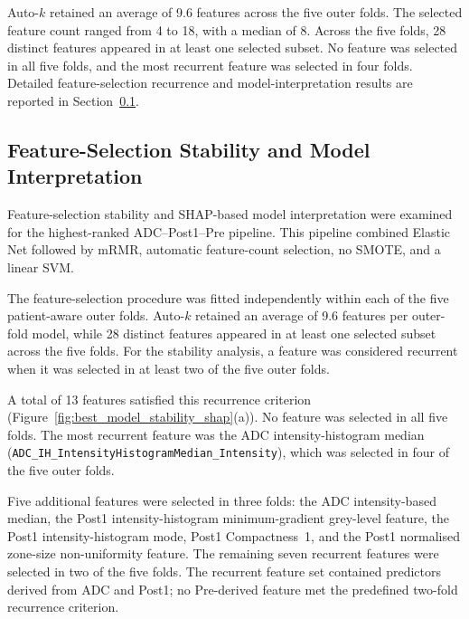 \documentclass[12pt,twocolumn]{article}
\begin{document}
Auto-\(k\) retained an average of 9.6 features across the five outer
folds. The selected feature count ranged from 4 to 18, with a median
of 8. Across the five folds, 28 distinct features appeared in at
least one selected subset. No feature was selected in all five folds,
and the most recurrent feature was selected in four folds. Detailed
feature-selection recurrence and model-interpretation results are
reported in Section~\ref{subsec:interpretability_results}.












\subsection{Feature-Selection Stability and Model Interpretation}
\label{subsec:interpretability_results}

Feature-selection stability and SHAP-based model interpretation were
examined for the highest-ranked ADC--Post1--Pre pipeline. This
pipeline combined Elastic Net followed by mRMR, automatic
feature-count selection, no SMOTE, and a linear SVM.

The feature-selection procedure was fitted independently within each
of the five patient-aware outer folds. Auto-\(k\) retained an average
of 9.6 features per outer-fold model, while 28 distinct features
appeared in at least one selected subset across the five folds. For
the stability analysis, a feature was considered recurrent when it
was selected in at least two of the five outer folds.

A total of 13 features satisfied this recurrence criterion
(Figure~\ref{fig:best_model_stability_shap}(a)). No feature was
selected in all five folds. The most recurrent feature was the ADC
intensity-histogram median
(\texttt{ADC\_IH\_IntensityHistogramMedian\_Intensity}), which was
selected in four of the five outer folds.

Five additional features were selected in three folds: the ADC
intensity-based median, the Post1 intensity-histogram minimum-gradient
grey-level feature, the Post1 intensity-histogram mode, Post1
Compactness~1, and the Post1 normalised zone-size non-uniformity
feature. The remaining seven recurrent features were selected in two
of the five folds. The recurrent feature set contained predictors
derived from ADC and Post1; no Pre-derived feature met the predefined
two-fold recurrence criterion.
\end{document}
